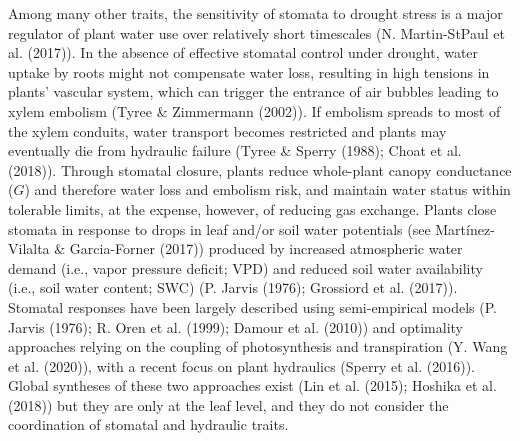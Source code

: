 \documentclass[11pt,twoside]{reedthesis}
\begin{document}
Among many other traits, the sensitivity of stomata to drought stress is
a major regulator of plant water use over relatively short timescales
(N. Martin-StPaul et al. (2017)). In the absence of effective stomatal
control under drought, water uptake by roots might not compensate water
loss, resulting in high tensions in plants' vascular system, which can
trigger the entrance of air bubbles leading to xylem embolism (Tyree \&
Zimmermann (2002)). If embolism spreads to most of the xylem conduits,
water transport becomes restricted and plants may eventually die from
hydraulic failure (Tyree \& Sperry (1988); Choat et al. (2018)). Through
stomatal closure, plants reduce whole-plant canopy conductance (\(G\))
and therefore water loss and embolism risk, and maintain water status
within tolerable limits, at the expense, however, of reducing gas
exchange. Plants close stomata in response to drops in leaf and/or soil
water potentials (see Martínez-Vilalta \& Garcia-Forner (2017)) produced
by increased atmospheric water demand (i.e., vapor pressure deficit;
VPD) and reduced soil water availability (i.e., soil water content; SWC)
(P. Jarvis (1976); Grossiord et al. (2017)). Stomatal responses have
been largely described using semi-empirical models (P. Jarvis (1976); R.
Oren et al. (1999); Damour et al. (2010)) and optimality approaches
relying on the coupling of photosynthesis and transpiration (Y. Wang et
al. (2020)), with a recent focus on plant hydraulics (Sperry et al.
(2016)). Global syntheses of these two approaches exist (Lin et al.
(2015); Hoshika et al. (2018)) but they are only at the leaf level, and
they do not consider the coordination of stomatal and hydraulic
traits.\par 
\end{document}

